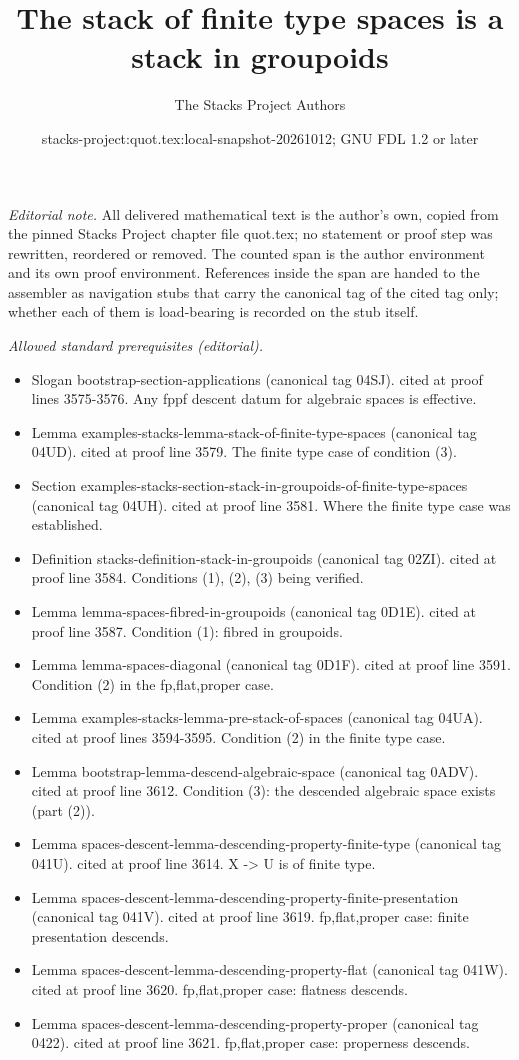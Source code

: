 \documentclass{stacks-project}
\title{The stack of finite type spaces is a stack in groupoids}
\author{The Stacks Project Authors}
\date{stacks-project:quot.tex:local-snapshot-20261012; GNU FDL 1.2 or later}
\theoremstyle{plain}
\theoremstyle{definition}
\theoremstyle{remark}
\numberwithin{equation}{subsection}
\begin{document}
\maketitle
\setcounter{subsection}{1}
\noindent\textit{Editorial note.} All delivered mathematical text is the author's own, copied from the pinned Stacks Project chapter file quot.tex; no statement or proof step was rewritten, reordered or removed. The counted span is the author environment and its own proof environment. References inside the span are handed to the assembler as navigation stubs that carry the canonical tag of the cited tag only; whether each of them is load-bearing is recorded on the stub itself.\par\medskip
\noindent\textit{Allowed standard prerequisites (editorial).}\begin{itemize}
\item Slogan bootstrap-section-applications (canonical tag 04SJ). cited at proof lines 3575-3576. Any fppf descent datum for algebraic spaces is effective.
\item Lemma examples-stacks-lemma-stack-of-finite-type-spaces (canonical tag 04UD). cited at proof line 3579. The finite type case of condition (3).
\item Section examples-stacks-section-stack-in-groupoids-of-finite-type-spaces (canonical tag 04UH). cited at proof line 3581. Where the finite type case was established.
\item Definition stacks-definition-stack-in-groupoids (canonical tag 02ZI). cited at proof line 3584. Conditions (1), (2), (3) being verified.
\item Lemma lemma-spaces-fibred-in-groupoids (canonical tag 0D1E). cited at proof line 3587. Condition (1): fibred in groupoids.
\item Lemma lemma-spaces-diagonal (canonical tag 0D1F). cited at proof line 3591. Condition (2) in the fp,flat,proper case.
\item Lemma examples-stacks-lemma-pre-stack-of-spaces (canonical tag 04UA). cited at proof lines 3594-3595. Condition (2) in the finite type case.
\item Lemma bootstrap-lemma-descend-algebraic-space (canonical tag 0ADV). cited at proof line 3612. Condition (3): the descended algebraic space exists (part (2)).
\item Lemma spaces-descent-lemma-descending-property-finite-type (canonical tag 041U). cited at proof line 3614. X -> U is of finite type.
\item Lemma spaces-descent-lemma-descending-property-finite-presentation (canonical tag 041V). cited at proof line 3619. fp,flat,proper case: finite presentation descends.
\item Lemma spaces-descent-lemma-descending-property-flat (canonical tag 041W). cited at proof line 3620. fp,flat,proper case: flatness descends.
\item Lemma spaces-descent-lemma-descending-property-proper (canonical tag 0422). cited at proof line 3621. fp,flat,proper case: properness descends.
\end{itemize}\medskip
\end{document}
